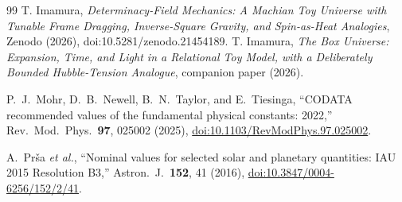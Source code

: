 \documentclass[aps,reprint,amsmath,amssymb,nofootinbib,superscriptaddress,floatfix]{revtex4-2}
\begin{document}
\begin{thebibliography}{99}
 T. Imamura, \emph{Determinacy-Field Mechanics: A
Machian Toy Universe with Tunable Frame Dragging, Inverse-Square
Gravity, and Spin-as-Heat Analogies}, Zenodo (2026),
doi:10.5281/zenodo.21454189.
 T. Imamura, \emph{The Box Universe: Expansion, Time,
and Light in a Relational Toy Model, with a Deliberately Bounded
Hubble-Tension Analogue}, companion paper (2026).


P.~J.~Mohr, D.~B.~Newell, B.~N.~Taylor, and E.~Tiesinga,
``CODATA recommended values of the fundamental physical constants:
2022,'' Rev.\ Mod.\ Phys.\ \textbf{97}, 025002 (2025),
\href{https://doi.org/10.1103/RevModPhys.97.025002}
{doi:10.1103/RevModPhys.97.025002}.

A.~Pr\v{s}a \emph{et al.}, ``Nominal values for selected solar and
planetary quantities: IAU 2015 Resolution B3,''
Astron.\ J.\ \textbf{152}, 41 (2016),
\href{https://doi.org/10.3847/0004-6256/152/2/41}
{doi:10.3847/0004-6256/152/2/41}.


\end{thebibliography}
\end{document}
